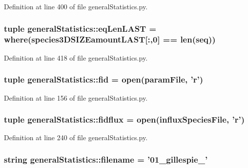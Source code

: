 \-Definition at line 400 of file general\-Statistics.\-py.

\hypertarget{namespacegeneral_statistics_a7b6c4c854f530c8f42d2e6cf8c76d40f}{
\subsubsection[{eq\-Len\-L\-A\-S\-T}]{\setlength{\rightskip}{0pt plus 5cm}tuple {\bf general\-Statistics\-::eq\-Len\-L\-A\-S\-T} = where({\bf species3\-D\-S\-I\-Z\-Eamount\-L\-A\-S\-T}\mbox{[}\-:,0\mbox{]} == len(seq))}}\label{namespacegeneral_statistics_a7b6c4c854f530c8f42d2e6cf8c76d40f}


\-Definition at line 418 of file general\-Statistics.\-py.

\hypertarget{namespacegeneral_statistics_a6d04dfb31ad3b33487a80fa7ba0ad5f2}{
\subsubsection[{fid}]{\setlength{\rightskip}{0pt plus 5cm}tuple {\bf general\-Statistics\-::fid} = open({\bf param\-File}, '{\bf r}')}}\label{namespacegeneral_statistics_a6d04dfb31ad3b33487a80fa7ba0ad5f2}


\-Definition at line 156 of file general\-Statistics.\-py.

\hypertarget{namespacegeneral_statistics_a709d2fc5d6a459dbc9c4a04023635a20}{
\subsubsection[{fidflux}]{\setlength{\rightskip}{0pt plus 5cm}tuple {\bf general\-Statistics\-::fidflux} = open({\bf influx\-Species\-File}, '{\bf r}')}}\label{namespacegeneral_statistics_a709d2fc5d6a459dbc9c4a04023635a20}


\-Definition at line 240 of file general\-Statistics.\-py.

\hypertarget{namespacegeneral_statistics_a9834b16ec1ee9c5bf0835e87b4c41108}{
\subsubsection[{filename}]{\setlength{\rightskip}{0pt plus 5cm}string {\bf general\-Statistics\-::filename} = '01\-\_\-gillespie\-\_\-'}}\label{namespacegeneral_statistics_a9834b16ec1ee9c5bf0835e87b4c41108}


